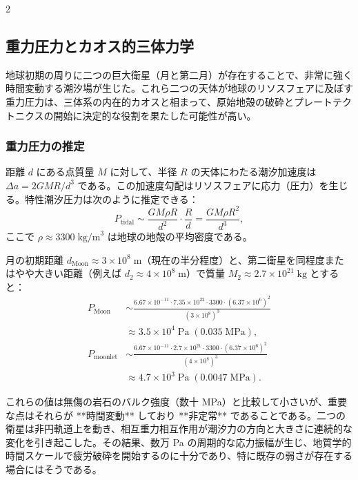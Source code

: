 \documentclass[12pt,a4paper]{article}
\begin{document}
\begin{multicols}{2}
		\subsection{重力圧力とカオス的三体力学}
		地球初期の周りに二つの巨大衛星（月と第二月）が存在することで、非常に強く時間変動する潮汐場が生じた。これら二つの天体が地球のリソスフェアに及ぼす重力圧力は、三体系の内在的カオスと相まって、原始地殻の破砕とプレートテクトニクスの開始に決定的な役割を果たした可能性が高い。
		
		\subsubsection{重力圧力の推定}
		距離 \(d\) にある点質量 \(M\) に対して、半径 \(R\) の天体にわたる潮汐加速度は \(\Delta a = 2GM R / d^{3}\) である。この加速度勾配はリソスフェアに応力（圧力）を生じる。特性潮汐圧力は次のように推定できる：
		\[
		P_{\text{tidal}} \sim \frac{GM \rho R}{d^{2}} \cdot \frac{R}{d} = \frac{GM \rho R^{2}}{d^{3}},
		\]
		ここで \(\rho \approx 3300\;\text{kg/m}^{3}\) は地球の地殻の平均密度である。
		
		月の初期距離 \(d_{\text{Moon}} \approx 3\times10^{8}\;\text{m}\)（現在の半分程度）と、第二衛星を同程度またはやや大きい距離（例えば \(d_{2} \approx 4\times10^{8}\;\text{m}\)）で質量 \(M_{2} \approx 2.7\times10^{21}\;\text{kg}\) とすると：
		\[
		\begin{aligned}
			P_{\text{Moon}} &\sim \frac{6.67\times10^{-11} \cdot 7.35\times10^{22} \cdot 3300 \cdot (6.37\times10^{6})^{2}}{(3\times10^{8})^{3}} \\
			&\approx 3.5 \times 10^{4}\;\text{Pa} \;(0.035\;\text{MPa}),\\
			P_{\text{moonlet}} &\sim \frac{6.67\times10^{-11} \cdot 2.7\times10^{21} \cdot 3300 \cdot (6.37\times10^{6})^{2}}{(4\times10^{8})^{3}} \\
			&\approx 4.7 \times 10^{3}\;\text{Pa} \;(0.0047\;\text{MPa}).
		\end{aligned}
		\]
		
		これらの値は無傷の岩石のバルク強度（数十 MPa）と比較して小さいが、重要な点はそれらが **時間変動** しており **非定常** であることである。二つの衛星は非円軌道上を動き、相互重力相互作用が潮汐力の方向と大きさに連続的な変化を引き起こした。その結果、数万 Pa の周期的な応力振幅が生じ、地質学的時間スケールで疲労破砕を開始するのに十分であり、特に既存の弱さが存在する場合にはそうである。
		

\end{multicols}
\end{document}
